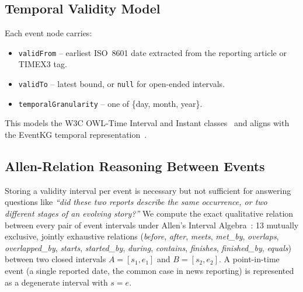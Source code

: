 \documentclass[conference]{IEEEtran}
\begin{document}
\subsection{Temporal Validity Model}

Each event node carries:
\begin{itemize}
  \item \texttt{validFrom} -- earliest ISO~8601 date extracted from the
        reporting article or TIMEX3 tag.
  \item \texttt{validTo} -- latest bound, or \texttt{null} for open-ended
        intervals.
  \item \texttt{temporalGranularity} -- one of \{day, month, year\}.
\end{itemize}
This models the W3C OWL-Time Interval and Instant classes~\cite{cox2017owltime}
and aligns with the EventKG temporal representation~\cite{gottschalk2019eventkg}.

\subsection{Allen-Relation Reasoning Between Events}
\label{sec:temporal-reasoning}

Storing a validity interval per event is necessary but not sufficient for
answering questions like \emph{``did these two reports describe the same
occurrence, or two different stages of an evolving story?''} We compute the
exact qualitative relation between every pair of event intervals under
Allen's Interval Algebra~\cite{allen1983interval}: 13 mutually exclusive,
jointly exhaustive relations (\emph{before}, \emph{after}, \emph{meets},
\emph{met\_by}, \emph{overlaps}, \emph{overlapped\_by}, \emph{starts},
\emph{started\_by}, \emph{during}, \emph{contains}, \emph{finishes},
\emph{finished\_by}, \emph{equals}) between two closed intervals
$A=[s_1,e_1]$ and $B=[s_2,e_2]$. A point-in-time event (a single reported
date, the common case in news reporting) is represented as a degenerate
interval with $s=e$.
\end{document}
